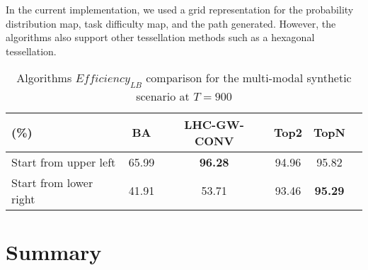\documentclass[journal]{IEEEtran}
\begin{document}

In the current implementation, we used a grid representation for the probability distribution map, task difficulty map, and the path generated. However, the algorithms also support other tessellation methods such as a hexagonal tessellation.
\begin{table}[!ht]
\caption{Algorithms $\mathit{Efficiency_{LB}}$ comparison for the multi-modal synthetic scenario at $T=900$}
	\centering
		\begin{tabular}
			{|l|c|c|c|c|c|}
			\hline
			(\%) & BA & LHC-GW-CONV & Top2 & TopN \\
			\hline
			Start from upper left & 65.99 & \textbf{96.28} & 94.96 & 95.82 \\
			\hline			
			Start from lower right & 41.91 & 53.71 & 93.46 & \textbf{95.29} \\			\hline			
		\end{tabular}
\label{Synthetic}
\end{table}

\section{Summary} 
\label{sec:Summary}
\end{document}
